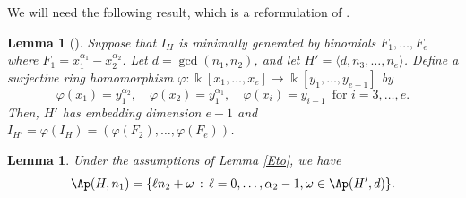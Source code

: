 \documentclass[11pt,twoside]{amsart}
\newtheorem{lem}[Theorem]{Lemma}
\theoremstyle{definition}
\numberwithin{equation}{section}
\begin{document}
We will need the following result, which is a reformulation of \cite[Theorem 3.3]{Et1}.

\begin{lem}[{\cite[Theorem 3.3]{Et1}\label{Eto}}]
Suppose that $I_H$ is minimally generated by binomials $F_1, \ldots, F_e$ where $F_1=x_1^{\alpha_1}-x_2^{\alpha_2}$. 
Let $d = \gcd(n_1,n_2)$, and let $H'=\langle d,n_3,\ldots,n_e \rangle$.  
Define a surjective ring homomorphism 
$\varphi:\Bbbk[x_1,\ldots,x_e] \rightarrow \Bbbk[y_1,\ldots,y_{e-1}]$ by
$$
\varphi(x_1)=y_1^{\alpha_2},\quad \varphi(x_2)=y_1^{\alpha_1},\quad \varphi(x_i)=y_{i-1}\,\text{ for }i=3,\ldots,e.
$$
Then, $H'$ has embedding dimension $e-1$ and $I_{H'}=\varphi(I_H)=(\varphi(F_2),\ldots,\varphi(F_e))$. 
\end{lem}

\begin{lem}\label{EqAperySets}
	Under the assumptions of Lemma \ref{Eto}, we have $$\Ap(H, n_1)=\{\ell n_2 +\omega \,: \, \ell = 0, \ldots, \alpha_2-1, \omega \in \Ap(H', d)\}.$$
\end{lem}
\end{document}
